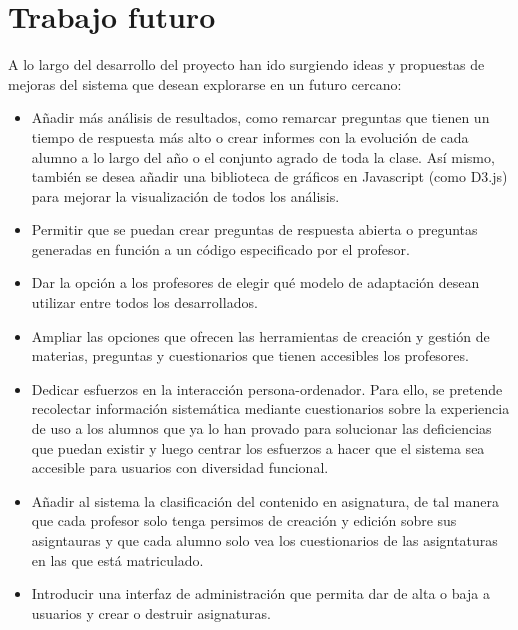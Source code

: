 \chapter{Trabajo futuro\label{sec:trabajo futuro}}

A lo largo del desarrollo del proyecto han ido surgiendo ideas y propuestas de mejoras del sistema que desean explorarse en un futuro cercano:

\begin{itemize}
	\item Añadir más análisis de resultados, como remarcar preguntas que tienen un tiempo de respuesta más alto o crear informes con la evolución de cada alumno a lo largo del año o el conjunto agrado de toda la clase. Así mismo, también se desea añadir una biblioteca de gráficos en Javascript (como D3.js) para mejorar la visualización de todos los análisis.
	\item Permitir que se puedan crear preguntas de respuesta abierta o preguntas generadas en función a un código especificado por el profesor.
	\item Dar la opción a los profesores de elegir qué modelo de adaptación desean utilizar entre todos los desarrollados.
	\item Ampliar las opciones que ofrecen las herramientas de creación y gestión de materias, preguntas y cuestionarios que tienen accesibles los profesores.
	\item Dedicar esfuerzos en la interacción persona-ordenador. Para ello, se pretende recolectar información sistemática mediante cuestionarios sobre la experiencia de uso a los alumnos que ya lo han provado para solucionar las deficiencias que puedan existir y luego centrar los esfuerzos a hacer que el sistema sea accesible para usuarios con diversidad funcional.
	\item Añadir al sistema la clasificación del contenido en asignatura, de tal manera que cada profesor solo tenga persimos de creación y edición sobre sus asigntauras y que cada alumno solo vea los cuestionarios de las asigntaturas en las que está matriculado.
	\item Introducir una interfaz de administración que permita dar de alta o baja a usuarios y crear o destruir asignaturas.
\end{itemize}
